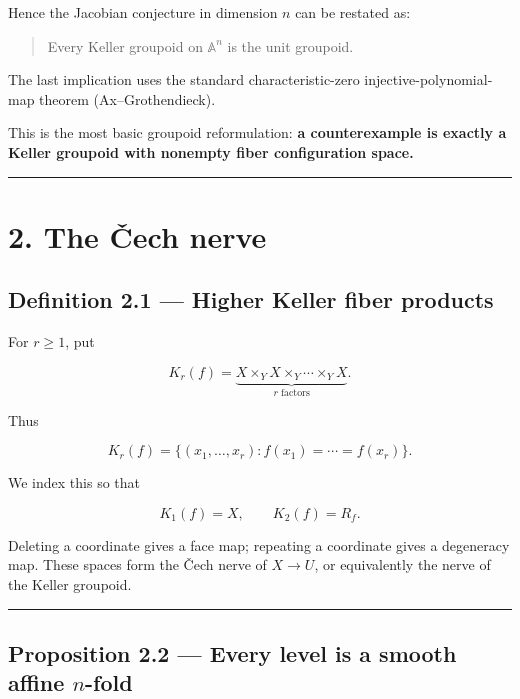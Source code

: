 Hence the Jacobian conjecture in dimension \(n\) can be restated as:

\begin{quote}
Every Keller groupoid on \(\mathbb A^n\) is the unit groupoid.
\end{quote}

The last implication uses the standard characteristic-zero
injective-polynomial-map theorem (Ax--Grothendieck).

This is the most basic groupoid reformulation: \textbf{a counterexample
is exactly a Keller groupoid with nonempty fiber configuration space.}

\begin{center}\rule{0.5\linewidth}{0.5pt}\end{center}

\section{2. The Čech nerve}\label{the-ux10dech-nerve}

\subsection{Definition 2.1 --- Higher Keller fiber
products}\label{definition-2.1-higher-keller-fiber-products}

For \(r\ge1\), put

\[
K_r(f)
=
\underbrace{X\times_Y X\times_Y\cdots\times_Y X}_{r\text{ factors}}.
\]

Thus

\[
K_r(f)
=
\{(x_1,\dots,x_r):f(x_1)=\cdots=f(x_r)\}.
\]

We index this so that

\[
K_1(f)=X,\qquad K_2(f)=R_f.
\]

Deleting a coordinate gives a face map; repeating a coordinate gives a
degeneracy map. These spaces form the Čech nerve of \(X\to U\), or
equivalently the nerve of the Keller groupoid.

\begin{center}\rule{0.5\linewidth}{0.5pt}\end{center}

\subsection{\texorpdfstring{Proposition 2.2 --- Every level is a smooth
affine
\(n\)-fold}{Proposition 2.2 --- Every level is a smooth affine n-fold}}\label{proposition-2.2-every-level-is-a-smooth-affine-n-fold}

